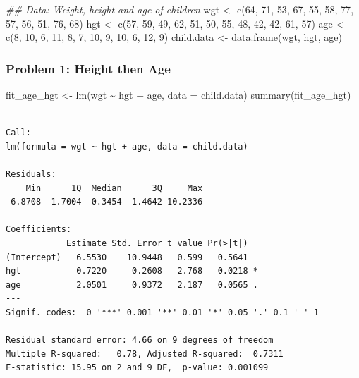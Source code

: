 \documentclass[
  letterpaper,
]{scrbook}
\newenvironment{Shaded}{\begin{snugshade}}{\end{snugshade}}
\newcommand{\AttributeTok}[1]{\textcolor[rgb]{0.40,0.45,0.13}{#1}}
\newcommand{\DecValTok}[1]{\textcolor[rgb]{0.68,0.00,0.00}{#1}}
\newcommand{\DocumentationTok}[1]{\textcolor[rgb]{0.37,0.37,0.37}{\textit{#1}}}
\newcommand{\FunctionTok}[1]{\textcolor[rgb]{0.28,0.35,0.67}{#1}}
\newcommand{\NormalTok}[1]{\textcolor[rgb]{0.00,0.23,0.31}{#1}}
\newcommand{\OtherTok}[1]{\textcolor[rgb]{0.00,0.23,0.31}{#1}}
\newcommand{\SpecialCharTok}[1]{\textcolor[rgb]{0.37,0.37,0.37}{#1}}
\begin{document}
\begin{Shaded}
\begin{Highlighting}[]
\DocumentationTok{\#\# Data: Weight, height and age of children}
\NormalTok{wgt }\OtherTok{\textless{}{-}} \FunctionTok{c}\NormalTok{(}\DecValTok{64}\NormalTok{, }\DecValTok{71}\NormalTok{, }\DecValTok{53}\NormalTok{, }\DecValTok{67}\NormalTok{, }\DecValTok{55}\NormalTok{, }\DecValTok{58}\NormalTok{, }\DecValTok{77}\NormalTok{, }\DecValTok{57}\NormalTok{, }\DecValTok{56}\NormalTok{, }\DecValTok{51}\NormalTok{, }\DecValTok{76}\NormalTok{, }\DecValTok{68}\NormalTok{)}
\NormalTok{hgt }\OtherTok{\textless{}{-}} \FunctionTok{c}\NormalTok{(}\DecValTok{57}\NormalTok{, }\DecValTok{59}\NormalTok{, }\DecValTok{49}\NormalTok{, }\DecValTok{62}\NormalTok{, }\DecValTok{51}\NormalTok{, }\DecValTok{50}\NormalTok{, }\DecValTok{55}\NormalTok{, }\DecValTok{48}\NormalTok{, }\DecValTok{42}\NormalTok{, }\DecValTok{42}\NormalTok{, }\DecValTok{61}\NormalTok{, }\DecValTok{57}\NormalTok{)}
\NormalTok{age }\OtherTok{\textless{}{-}} \FunctionTok{c}\NormalTok{(}\DecValTok{8}\NormalTok{, }\DecValTok{10}\NormalTok{, }\DecValTok{6}\NormalTok{, }\DecValTok{11}\NormalTok{, }\DecValTok{8}\NormalTok{, }\DecValTok{7}\NormalTok{, }\DecValTok{10}\NormalTok{, }\DecValTok{9}\NormalTok{, }\DecValTok{10}\NormalTok{, }\DecValTok{6}\NormalTok{, }\DecValTok{12}\NormalTok{, }\DecValTok{9}\NormalTok{)}
\NormalTok{child.data }\OtherTok{\textless{}{-}} \FunctionTok{data.frame}\NormalTok{(wgt, hgt, age)}
\end{Highlighting}
\end{Shaded}

\subsubsection{Problem 1: Height then
Age}\label{problem-1-height-then-age}

\begin{Shaded}
\begin{Highlighting}[]
\NormalTok{fit\_age\_hgt }\OtherTok{\textless{}{-}} \FunctionTok{lm}\NormalTok{(wgt }\SpecialCharTok{\textasciitilde{}}\NormalTok{ hgt }\SpecialCharTok{+}\NormalTok{ age, }\AttributeTok{data =}\NormalTok{ child.data)}
\FunctionTok{summary}\NormalTok{(fit\_age\_hgt)}
\end{Highlighting}
\end{Shaded}

\begin{verbatim}

Call:
lm(formula = wgt ~ hgt + age, data = child.data)

Residuals:
    Min      1Q  Median      3Q     Max 
-6.8708 -1.7004  0.3454  1.4642 10.2336 

Coefficients:
            Estimate Std. Error t value Pr(>|t|)  
(Intercept)   6.5530    10.9448   0.599   0.5641  
hgt           0.7220     0.2608   2.768   0.0218 *
age           2.0501     0.9372   2.187   0.0565 .
---
Signif. codes:  0 '***' 0.001 '**' 0.01 '*' 0.05 '.' 0.1 ' ' 1

Residual standard error: 4.66 on 9 degrees of freedom
Multiple R-squared:   0.78, Adjusted R-squared:  0.7311 
F-statistic: 15.95 on 2 and 9 DF,  p-value: 0.001099
\end{verbatim}
\end{document}
